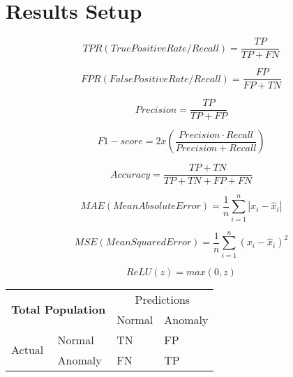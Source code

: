 \section{Results Setup}

\begin{equation}
    TPR(TruePositiveRate/Recall) = \frac{TP}{TP + FN}
\end{equation}

\begin{equation}
    FPR(FalsePositiveRate/Recall) = \frac{FP}{FP + TN}
\end{equation}

\begin{equation}
    Precision = \frac{TP}{TP + FP}
\end{equation}

\begin{equation}
    F1 - score = 2 x (\frac{Precision \cdot Recall}{Precision + Recall})
\end{equation}

\begin{equation}
    Accuracy = \frac{TP + TN}{TP + TN + FP + FN}
\end{equation}

\begin{equation}
    MAE(Mean Absolute Error) = \dfrac{1}{n}  \sum_{i=1}^{n}|x_i-\hat{x}_i|
\end{equation}

\begin{equation}
    MSE(Mean Squared Error) = \dfrac{1}{n}  \sum_{i=1}^{n}(x_i-\hat{x}_i)^2
\end{equation}

\begin{equation}
    ReLU(z) = max(0, z)
\end{equation}


\begin{table}[h]
\centering
\begin{tabular}{|ll|ll|}
\hline
\multicolumn{2}{|c|}{\multirow{2}{*}{\textbf{Total Population}}} & \multicolumn{2}{c|}{Predictions}      \\ \cline{3-4} 
\multicolumn{2}{|c|}{}                                           & \multicolumn{1}{l|}{Normal} & Anomaly \\ \hline
\multicolumn{1}{|l|}{\multirow{2}{*}{Actual}}      & Normal      & \multicolumn{1}{l|}{TN}     & FP      \\ \cline{2-4} 
\multicolumn{1}{|l|}{}                             & Anomaly     & \multicolumn{1}{l|}{FN}     & TP      \\ \hline
\end{tabular}
\end{table}

